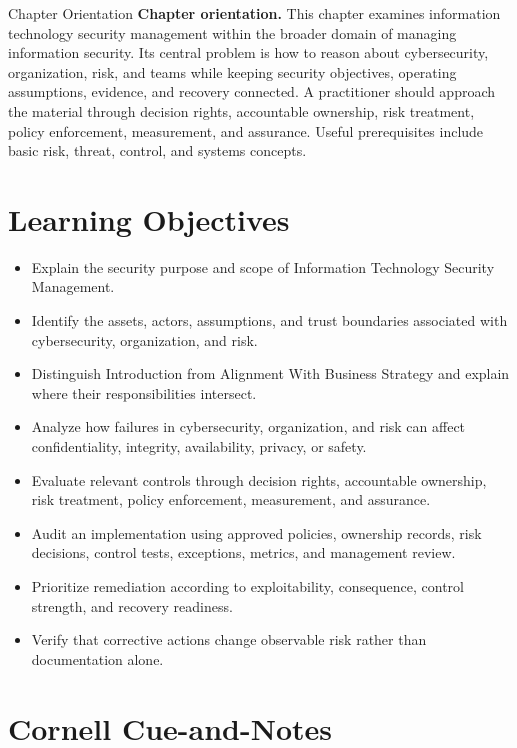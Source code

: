 \documentclass[11pt,letterpaper]{article}
\title{\CornellDocumentTitle}
\author{}
\date{}
\begin{document}
\maketitle
\begin{CornellOverviewBox}{Chapter Orientation}
\textbf{Chapter orientation.} This chapter examines information technology security management within the broader domain of managing information security. Its central problem is how to reason about cybersecurity, organization, risk, and teams while keeping security objectives, operating assumptions, evidence, and recovery connected. A practitioner should approach the material through decision rights, accountable ownership, risk treatment, policy enforcement, measurement, and assurance. Useful prerequisites include basic risk, threat, control, and systems concepts.
\end{CornellOverviewBox}
\section*{Learning Objectives}
\begin{itemize}
\item Explain the security purpose and scope of Information Technology Security Management.
\item Identify the assets, actors, assumptions, and trust boundaries associated with cybersecurity, organization, and risk.
\item Distinguish Introduction from Alignment With Business Strategy and explain where their responsibilities intersect.
\item Analyze how failures in cybersecurity, organization, and risk can affect confidentiality, integrity, availability, privacy, or safety.
\item Evaluate relevant controls through decision rights, accountable ownership, risk treatment, policy enforcement, measurement, and assurance.
\item Audit an implementation using approved policies, ownership records, risk decisions, control tests, exceptions, metrics, and management review.
\item Prioritize remediation according to exploitability, consequence, control strength, and recovery readiness.
\item Verify that corrective actions change observable risk rather than documentation alone.
\end{itemize}
\section*{Cornell Cue-and-Notes}
\end{document}
